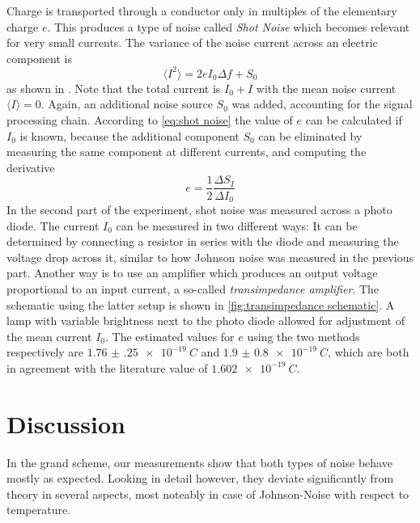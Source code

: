 \documentclass[
    parskip=half, 
    twoside=false,
    twocolumn=true,
    fontsize=11pt,
]{scrarticle}
\begin{document}
Charge is transported through a conductor only in multiples of the elementary charge $e$. This produces a type of noise called \textit{Shot Noise} which becomes relevant for very small currents. The variance of the noise current across an electric component is
\begin{equation}
    \label{eq:shot noise}
    \langle I^2 \rangle = 2 e I_0 \Delta f + S_0
\end{equation}
as shown in \autocite{Buch}. Note that the total current is $I_0 + I$ with the mean noise current $\langle I \rangle = 0$. Again, an additional noise source $S_0$ was added, accounting for the signal processing chain. According to \autoref{eq:shot noise} the value of $e$ can be calculated if $I_0$ is known, because the additional component $S_0$ can be eliminated by measuring the same component at different currents, and computing the derivative
\begin{equation}
 e = \frac{1}{2}\frac{\Delta S_I}{\Delta I_0}
\end{equation}
In the second part of the experiment, shot noise was measured across a photo diode. The current $I_0$ can be measured in two different ways: It can be determined by connecting a resistor in series with the diode and measuring the voltage drop across it, similar to how Johnson noise was measured in the previous part. Another way is to use an amplifier which produces an output voltage proportional to an input current, a so-called \textit{transimpedance amplifier}. The schematic using the latter setup is shown in \autoref{fig:transimpedance schematic}. A lamp with variable brightness next to the photo diode allowed for adjustment of the mean current $I_0$.
The estimated values for $e$ using the two methods respectively are $\SI{1.76(25)e-19}{C}$ and $\SI{1.9(08)e-19}{C}$, which are both in agreement with the literature value of $\SI{1.602e-19}{C}$.

\section{Discussion}
In the grand scheme, our measurements show that both types of noise behave mostly as expected. Looking in detail however, they deviate significantly from theory in several aspects, most noteably in case of Johnson-Noise with respect to temperature.
\end{document}
